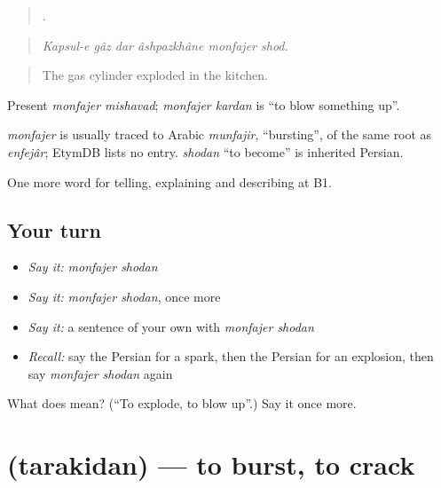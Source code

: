 \begin{quote}
     .
\end{quote}

\begin{quote}
\emph{Kapsul-e gâz dar âshpazkhâne monfajer shod.}
\end{quote}

\begin{quote}
The gas cylinder exploded in the kitchen.
\end{quote}

Present \emph{monfajer mishavad}; \emph{monfajer kardan} is \textquotedblleft{}to blow something up\textquotedblright{}.

\begin{cousinweb}
\emph{monfajer} is usually traced to Arabic \emph{munfajir}, \textquotedblleft{}bursting\textquotedblright{}, of the same root as \emph{enfejâr}; EtymDB lists no entry. \emph{shodan} \textquotedblleft{}to become\textquotedblright{} is inherited Persian.
\end{cousinweb}

\begin{grammarlens}[title={What you've built}]
One more word for telling, explaining and describing at B1.
\end{grammarlens}

\subsection*{Your turn}
\begin{itemize}
\raggedright
  \item \emph{Say it:} \emph{monfajer shodan}
  \item \emph{Say it:} \emph{monfajer shodan}, once more
  \item \emph{Say it:} a sentence of your own with \emph{monfajer shodan}
  \item \emph{Recall:} say the Persian for a spark, then the Persian for an explosion, then say \emph{monfajer shodan} again
\end{itemize}

\begin{tcolorbox}[breakable,colback=teal!4,colframe=teal!35!black,title={Before you move on}]
What does   mean? (\textquotedblleft{}To explode, to blow up\textquotedblright{}.) Say it once more.
\end{tcolorbox}
\section[\texorpdfstring{\fa{ترکیدن} (tarakidan)}{ترکیدن (tarakidan)}]{ (tarakidan) — to burst, to crack}

